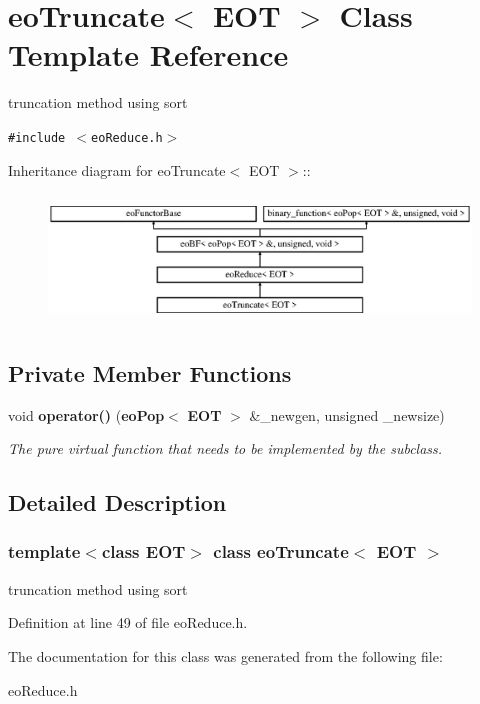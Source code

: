 \section{eo\-Truncate$<$ EOT $>$ Class Template Reference}
\label{classeo_truncate}
truncation method using sort  


{\tt \#include $<$eo\-Reduce.h$>$}

Inheritance diagram for eo\-Truncate$<$ EOT $>$::\begin{figure}[H]
\begin{center}
\leavevmode
\includegraphics[height=3.45679cm]{classeo_truncate}
\end{center}
\end{figure}
\subsection*{Private Member Functions}
\begin{CompactItemize}
\item 
void {\bf operator()} ({\bf eo\-Pop}$<$ {\bf EOT} $>$ \&\_\-newgen, unsigned \_\-newsize)\label{classeo_truncate_d0}

\begin{CompactList}\small\item\em The pure virtual function that needs to be implemented by the subclass. \item\end{CompactList}\end{CompactItemize}


\subsection{Detailed Description}
\subsubsection*{template$<$class EOT$>$ class eo\-Truncate$<$ EOT $>$}

truncation method using sort 



Definition at line 49 of file eo\-Reduce.h.

The documentation for this class was generated from the following file:\begin{CompactItemize}
\item 
eo\-Reduce.h\end{CompactItemize}

